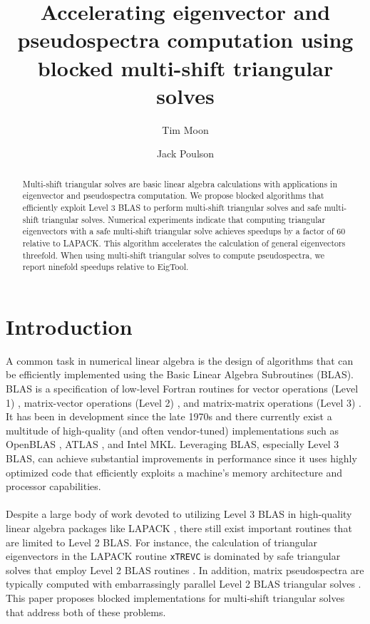 \documentclass{article}
\begin{document}
\title{Accelerating eigenvector and pseudospectra computation using
  blocked multi-shift triangular solves}
\author[1]{Tim Moon}
\author[1,2]{Jack Poulson}
\maketitle

\begin{abstract}
  Multi-shift triangular solves are basic linear algebra calculations
  with applications in eigenvector and pseudospectra computation. We
  propose blocked algorithms that efficiently exploit Level 3 BLAS to
  perform multi-shift triangular solves and safe multi-shift
  triangular solves. Numerical experiments indicate that computing
  triangular eigenvectors with a safe multi-shift triangular solve
  achieves speedups by a factor of 60 relative to LAPACK. This
  algorithm accelerates the calculation of general eigenvectors
  threefold. When using multi-shift triangular solves to compute
  pseudospectra, we report ninefold speedups relative to EigTool.
\end{abstract}

\section{Introduction}
A common task in numerical linear algebra is the design of algorithms
that can be efficiently implemented using the Basic Linear Algebra
Subroutines (BLAS). BLAS is a specification of low-level Fortran
routines for vector operations (Level 1) \cite{lawson1979basic},
matrix-vector operations (Level 2) \cite{dongarra1988extended,
  dongarra1988algorithm}, and matrix-matrix operations (Level 3)
\cite{dongarra1990set, dongarra1990algorithm}. It has been in
development since the late 1970s and there currently exist a multitude
of high-quality (and often vendor-tuned) implementations such as
OpenBLAS \cite{zhang2012model, wang2013augem}, ATLAS
\cite{whaley2005minimizing}, and Intel MKL. Leveraging BLAS,
especially Level 3 BLAS, can achieve substantial improvements in
performance since it uses highly optimized code that efficiently
exploits a machine's memory architecture and processor capabilities.

\paragraph{}
Despite a large body of work devoted to utilizing Level 3 BLAS in
high-quality linear algebra packages like LAPACK
\cite{anderson1999lapack}, there still exist important routines that
are limited to Level 2 BLAS. For instance, the calculation of
triangular eigenvectors in the LAPACK routine \texttt{xTREVC} is
dominated by safe triangular solves that employ Level 2 BLAS routines
\cite{gates2014accelerating}.  In addition, matrix pseudospectra are
typically computed with embarrassingly parallel Level 2 BLAS
triangular solves \cite{trefethen2005spectra}.  This paper proposes
blocked implementations for multi-shift triangular solves that address
both of these problems.
\end{document}
